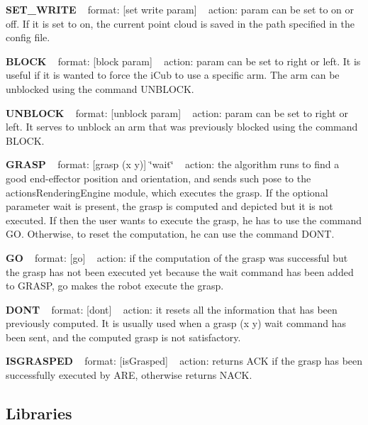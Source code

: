 {\bfseries S\+E\+T\+\_\+\+W\+R\+I\+TE} ~\newline
format\+: \mbox{[}set write param\mbox{]} ~\newline
action\+: param can be set to on or off. If it is set to on, the current point cloud is saved in the path specified in the config file.

{\bfseries B\+L\+O\+CK} ~\newline
format\+: \mbox{[}block param\mbox{]} ~\newline
action\+: param can be set to right or left. It is useful if it is wanted to force the i\+Cub to use a specific arm. The arm can be unblocked using the command U\+N\+B\+L\+O\+CK.

{\bfseries U\+N\+B\+L\+O\+CK} ~\newline
format\+: \mbox{[}unblock param\mbox{]} ~\newline
action\+: param can be set to right or left. It serves to unblock an arm that was previously blocked using the command B\+L\+O\+CK.

{\bfseries G\+R\+A\+SP} ~\newline
format\+: \mbox{[}grasp (x y)\mbox{]} \char`\"{}wait\char`\"{} ~\newline
action\+: the algorithm runs to find a good end-\/effector position and orientation, and sends such pose to the actions\+Rendering\+Engine module, which executes the grasp. If the optional parameter wait is present, the grasp is computed and depicted but it is not executed. If then the user wants to execute the grasp, he has to use the command GO. Otherwise, to reset the computation, he can use the command D\+O\+NT.

{\bfseries GO} ~\newline
format\+: \mbox{[}go\mbox{]} ~\newline
action\+: if the computation of the grasp was successful but the grasp has not been executed yet because the wait command has been added to G\+R\+A\+SP, go makes the robot execute the grasp.

{\bfseries D\+O\+NT} ~\newline
format\+: \mbox{[}dont\mbox{]} ~\newline
action\+: it resets all the information that has been previously computed. It is usually used when a grasp (x y) wait command has been sent, and the computed grasp is not satisfactory.

{\bfseries I\+S\+G\+R\+A\+S\+P\+ED} ~\newline
format\+: \mbox{[}is\+Grasped\mbox{]} ~\newline
action\+: returns A\+CK if the grasp has been successfully executed by A\+RE, otherwise returns N\+A\+CK.\hypertarget{group__handIKModule_lib_sec}{}\subsection{Libraries}\label{group__handIKModule_lib_sec}


